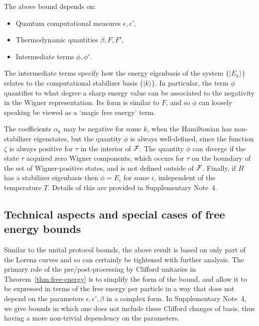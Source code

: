 \documentclass[
onecolumn,
superscriptaddress
]{revtex4-1}
\newcommand{\revhigh}[1]{{\color{red}#1}}
\def\>{\rangle}
\def\F{{\cal F}}
\begin{document}
The above bound depends on: 
\begin{itemize}
\item Quantum computational measures $\epsilon, \epsilon'$,
\item Thermodynamic quantities $\beta, F, F',$
\item Intermediate terms $\phi, \phi'$. 
\end{itemize}
The intermediate terms specify how the energy eigenbasis of the system $\{|E_k\>\}$ relates to the computational stabilizer basis $\{|k\>\}$.  In particular, the term $\phi$ quantifies to what degree a sharp energy value can be associated to the negativity in the Wigner representation. Its form is similar to $F$, and so $\phi$ can loosely speaking be viewed as a `magic free energy' term. 

The coefficients $\alpha_k$ may be negative for some $k$, when the Hamiltonian has non-stabilizer eigenstates, but the quantity $\phi$ is always well-defined, since the function $\zeta$ is always positive for $\tau$ in the interior of $\F$. The quantity $\phi$ can diverge if the state $\tau$ acquired zero Wigner components, which occurs for $\tau$ on the boundary of the set of Wigner-positive states, and is not defined outside of $\F$. Finally, if $H$ has a stabilizer eigenbasis then $\phi = E_i$ for some $i$, independent of the temperature $T$. Details of this are provided in Supplementary Note~4.

\revhigh{
\subsection*{Technical aspects and special cases of free energy bounds}
}

Similar to the unital protocol bounds, the above result is based on only part of the Lorenz curves and so can certainly be tightened with further analysis. The primary role of the pre/post-processing by Clifford unitaries in Theorem~\ref{thm:free-energy} is to simplify the form of the bound, and allow it to be expressed in terms of the free energy per particle in a way that does not depend on the parameters $\epsilon, \epsilon', \beta$ in a complex form. In Supplementary Note~4, we give bounds in which one does not include these Clifford changes of basis, thus having a more non-trivial dependency on the parameters.
\end{document}
